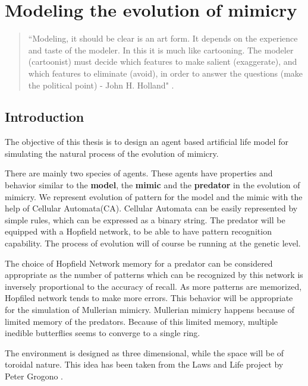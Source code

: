 \chapter{Modeling the evolution of mimicry}

\begin{quotation}
``Modeling, it should be clear is an art form. It depends on the experience and taste of the modeler. In this it is much like cartooning. The modeler (cartoonist) must decide which features to make salient (exaggerate), and which features to eliminate (avoid), in order to answer the questions (make the political point) - John H. Holland" \cite{holland1996}.
\end{quotation}

\section{Introduction}
The objective of this thesis is to design an agent based artificial life model for simulating the natural process of the evolution of mimicry.

There are mainly two species of agents. These agents have properties and behavior similar to the \textbf{model}, the \textbf{mimic} and the \textbf{predator} in the evolution of mimicry. We represent evolution of pattern for the model and the mimic with the help of Cellular Automata(CA). Cellular Automata can be easily represented by simple rules, which can be expressed as a binary string. The predator will be equipped with a Hopfield network, to be able to have pattern recognition capability. The process of evolution will of course be running at the genetic level. 

The choice of Hopfield Network memory for a predator can be considered appropriate as the number of patterns which can be recognized by this network is inversely proportional to the accuracy of recall. As more patterns are memorized, Hopfiled network tends to make more errors. This behavior will be appropriate for the simulation of Mullerian mimicry. Mullerian mimicry happens because of limited memory of the predators. Because of this limited memory, multiple inedible butterflies seems to converge to a single ring.

The environment is designed as three dimensional, while the space will be of toroidal nature. This idea has been taken from the Laws and Life project by Peter Grogono \cite{grogono2003}.

